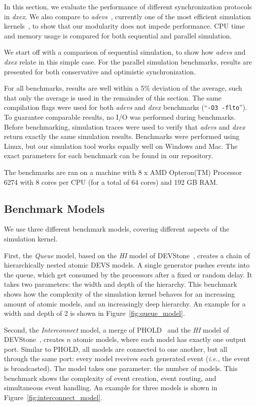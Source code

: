 In this section, we evaluate the performance of different synchronization protocols in \textit{dxex}.
We also compare to \textit{adevs}~\cite{adevs}, currently one of the most efficient simulation kernels~\cite{DEVStoneJournal}, to show that our modularity does not impede performance.
CPU time and memory usage is compared for both sequential and parallel simulation.

We start off with a comparison of sequential simulation, to show how \textit{adevs} and \textit{dxex} relate in this simple case.
For the parallel simulation benchmarks, results are presented for both conservative and optimistic synchronization.

For all benchmarks, results are well within a 5\% deviation of the average, such that only the average is used in the remainder of this section.
The same compilation flags were used for both \textit{adevs} and \textit{dxex} benchmarks (``\texttt{-O3 -flto}'').
To guarantee comparable results, no I/O was performed during benchmarks.
Before benchmarking, simulation traces were used to verify that \textit{adevs} and \textit{dxex} return exactly the same simulation results.
Benchmarks were performed using Linux, but our simulation tool works equally well on Windows and Mac.
The exact parameters for each benchmark can be found in our repository. 

The benchmarks are ran on a machine with 8 x AMD Opteron(TM) Processor 6274 with 8 cores per CPU (for a total of 64 cores) and 192 GB RAM.

\subsection{Benchmark Models}
We use three different benchmark models, covering different aspects of the simulation kernel.

First, the \textit{Queue} model, based on the \textit{HI} model of DEVStone~\cite{DEVStone}, creates a chain of hierarchically nested atomic \textsf{DEVS} models.
A single generator pushes events into the queue, which get consumed by the processors after a fixed or random delay.
It takes two parameters: the width and depth of the hierarchy.
This benchmark shows how the complexity of the simulation kernel behaves for an increasing amount of atomic models, and an increasingly deep hierarchy.
An example for a width and depth of 2 is shown in Figure~\ref{fig:queue_model}.
	
Second, the \textit{Interconnect} model, a merge of PHOLD~\cite{PHOLD} and the \textit{HI} model of DEVStone~\cite{DEVStone}, creates $n$ atomic models, where each model has exactly one output port.
Similar to PHOLD, all models are connected to one another, but all through the same port: every model receives each generated event (\textit{i.e.}, the event is broadcasted).
The model takes one parameter: the number of models.
This benchmark shows the complexity of event creation, event routing, and simultaneous event handling.
An example for three models is shown in Figure~\ref{fig:interconnect_model}.


